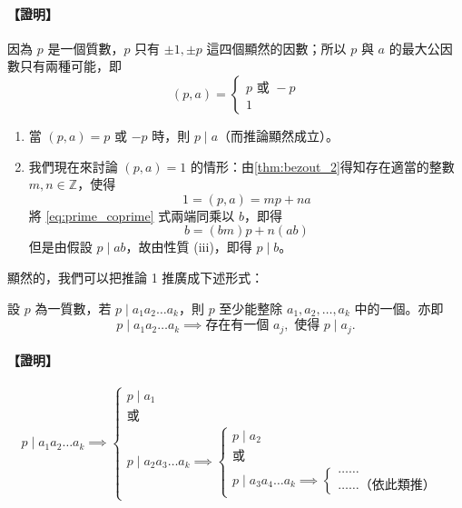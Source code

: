 \paragraph{【證明】}
因為 $p$ 是一個質數，$p$ 只有 $\pm 1, \pm p$ 這四個顯然的因數；所以 $p$ 與 $a$ 的最大公因數只有兩種可能，即
\begin{equation*}
  (p, a) = \begin{cases} p \text{ 或 } -p \\ 1 \end{cases}
\end{equation*}
\begin{enumerate}[(1)]
  \item 當 $(p, a) = p$ 或 $-p$ 時，則 $p \mid a$（而推論顯然成立）。
  \item 我們現在來討論 $(p, a) = 1$ 的情形：由\cref{thm:bezout_2}得知存在適當的整數 $m, n \in \mathbb{Z}$，使得
  \begin{equation}
    1 = (p, a) = mp + na \label{eq:prime_coprime}
  \end{equation}
  將 \eqref{eq:prime_coprime} 式兩端同乘以 $b$，即得
  \begin{equation}
    b = (bm)p + n(ab) \label{eq:prime_coprime_mul}
  \end{equation}
  但是由假設 $p \mid ab$，故由性質 (iii)，即得 $p \mid b$。
\end{enumerate}

顯然的，我們可以把推論 1 推廣成下述形式：

\begin{corollary}\label{cor:prime_div_k_prod}
設 $p$ 為一質數，若 $p \mid a_1 a_2 \dots a_k$，則 $p$ 至少能整除 $a_1, a_2, \dots, a_k$ 中的一個。亦即
\begin{equation*}
  p \mid a_1 a_2 \dots a_k \implies \text{存在有一個 } a_j, \text{ 使得 } p \mid a_j.
\end{equation*}
\end{corollary}

\paragraph{【證明】}
\begin{equation*}
  p \mid a_1 a_2 \dots a_k \implies \begin{cases}
    p \mid a_1 \\
    \text{或} \\
    p \mid a_2 a_3 \dots a_k \implies \begin{cases}
      p \mid a_2 \\
      \text{或} \\
      p \mid a_3 a_4 \dots a_k \implies \begin{cases}
        \dots\dots \\
        \dots\dots \text{（依此類推）}
      \end{cases}
    \end{cases}
  \end{cases}
\end{equation*}

